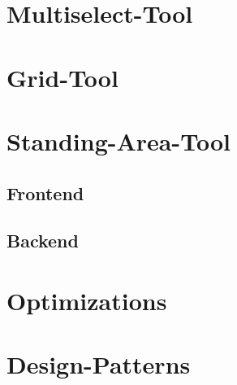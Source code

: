 \section{Multiselect-Tool}

\section{Grid-Tool}

\section{Standing-Area-Tool}

\subsection{Frontend}

\subsection{Backend}

\section{Optimizations}

\section{Design-Patterns}
